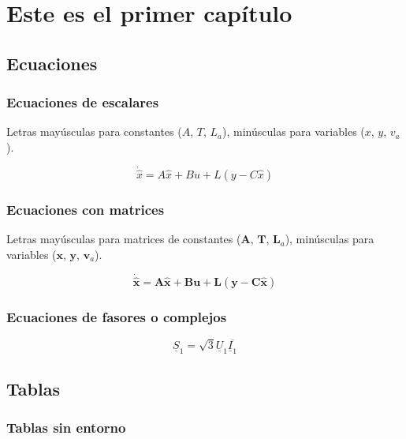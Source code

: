\chapter{Este es el primer capítulo}

\section{Ecuaciones}

\subsection{Ecuaciones de escalares}

Letras mayúsculas para constantes ($A$, $T$, $L_a$), minúsculas para variables ($x$, $y$, $v_a$).

\begin{equation}
	\dot {\hat x} = A \hat x + B u + L \left( y - C \hat x \right)  
\end{equation}


\subsection{Ecuaciones con matrices}

Letras mayúsculas para matrices de constantes ($\mathbf{A}$, $\mathbf{T}$, $\mathbf{L}_a$), minúsculas para variables ($\mathbf{x}$, $\mathbf{y}$, $\mathbf{v}_a$).

\begin{equation}
	\mathbf{\dot {\hat  x} = A \hat x + B u + L \left( y - C \hat x \right) }
\end{equation}

\subsection{Ecuaciones de fasores o complejos}

\begin{equation}
	\underline S_1 = \sqrt{3} \underline U_1 \overline{\underline I_1} 
\end{equation}

\section{Tablas}

\subsection{Tablas sin entorno}


